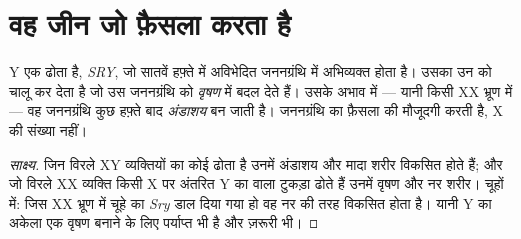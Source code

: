 \section{वह जीन जो फ़ैसला करता है}

\begin{proposition}\label{prop:g11:becoming-male-female:sry}
Y  एक  ढोता है, \emph{SRY}, जो सातवें हफ़्ते में
अविभेदित जननग्रंथि में अभिव्यक्त होता है। उसका  उन  को चालू कर
देता है जो उस जननग्रंथि को \emph{वृषण} में बदल देते हैं। उसके अभाव में ---
यानी किसी XX भ्रूण में --- वह जननग्रंथि कुछ हफ़्ते बाद \emph{अंडाशय} बन
जाती है। जननग्रंथि का फ़ैसला  की मौजूदगी करती है, X  की संख्या
नहीं।
\end{proposition}
\begin{proof}[साक्ष्य]
जिन विरले XY व्यक्तियों का  कोई  ढोता है उनमें अंडाशय और
मादा शरीर विकसित होते हैं; और जो विरले XX व्यक्ति किसी X पर अंतरित Y का
 वाला टुकड़ा ढोते हैं उनमें वृषण और नर शरीर। चूहों में: जिस XX भ्रूण में
चूहे का \emph{Sry}  डाल दिया गया हो वह नर की तरह विकसित होता है। यानी Y
का अकेला एक  वृषण बनाने के लिए पर्याप्त भी है और ज़रूरी भी।
\end{proof}


